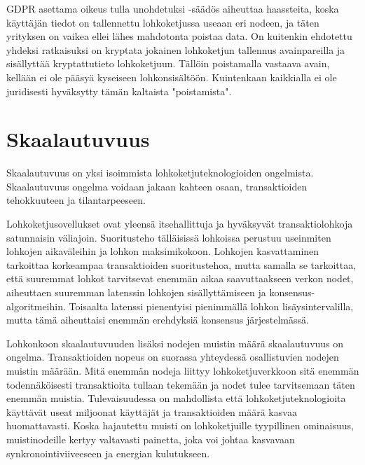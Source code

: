 \documentclass[utf8,bachelor]{gradu3}
\begin{document}
GDPR asettama oikeus tulla unohdetuksi -säädös aiheuttaa haassteita, koska käyttäjän tiedot on tallennettu lohkoketjussa useaan eri nodeen, ja täten yrityksen on vaikea ellei lähes mahdotonta poistaa data. On kuitenkin ehdotettu yhdeksi ratkaisuksi on kryptata jokainen lohkoketjun tallennus avainpareilla ja sisällyttää kryptattutieto lohkoketjuun. Tällöin poistamalla vastaava avain, kellään ei ole pääsyä kyseiseen lohkonsisältöön. Kuintenkaan kaikkialla ei ole juridisesti hyväksytty tämän kaltaista "poistamista". \parencite{ali2019blockchain}

\section{Skaalautuvuus}
Skaalautuvuus on yksi isoimmista lohkoketjuteknologioiden ongelmista. Skaalautuvuus ongelma voidaan jakaan kahteen osaan, transaktioiden tehokkuuteen ja tilantarpeeseen.

Lohkoketjusovellukset ovat yleensä itsehallittuja ja hyväksyvät transaktiolohkoja satunnaisin väliajoin.
Suoritusteho tälläisissä lohkoissa perustuu useinmiten lohkojen aikaväleihin ja lohkon maksimikokoon.
Lohkojen kasvattaminen tarkoittaa korkeampaa transaktioiden suoritustehoa, mutta samalla se tarkoittaa, että suuremmat lohkot tarvitsevat enemmän aikaa saavuttaakseen verkon nodet, aiheuttaen suuremman latenssin lohkojen sisällyttämiseen ja konsensus-algoritmeihin.
Toisaalta latenssi pienentyisi pienimmällä lohkon lisäysintervalilla, mutta tämä aiheuttaisi  enemmän erehdyksiä konsensus järjestelmässä.

Lohkonkoon skaalautuvuuden lisäksi nodejen muistin määrä skaalautuvuus on ongelma. Transaktioiden nopeus on suorassa yhteydessä osallistuvien nodejen muistin määrään.
Mitä enemmän nodeja liittyy lohkoketjuverkkoon sitä enemmän todennäköisesti transaktioita tullaan tekemään ja nodet tulee tarvitsemaan täten enemmän muistia.
Tulevaisuudessa on mahdollista että lohkoketjuteknologioita käyttävät useat miljoonat käyttäjät ja transaktioiden määrä kasvaa huomattavasti.
Koska hajautettu muisti on lohkoketjuille tyypillinen ominaisuus, muistinodeille kertyy valtavasti painetta, joka voi johtaa kasvavaan synkronointiviiveeseen ja energian kulutukseen.

\end{document}

